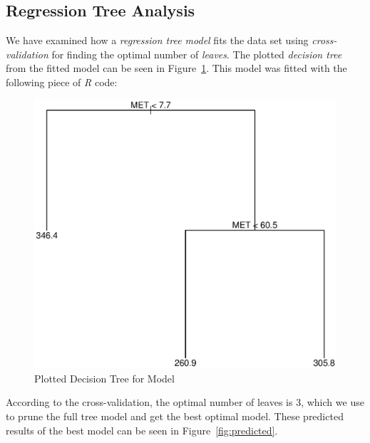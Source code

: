 \documentclass[a4paper,12pt]{article}
\begin{document}
    \subsection*{Regression Tree Analysis}

        We have examined how a \emph{regression tree model} fits the data set using \emph{cross-validation} for finding the optimal number of \emph{leaves}. The plotted \emph{decision tree} from the fitted model can be seen in Figure~\ref{fig:tree}. This model was fitted with the following piece of \emph{R} code:

        

        \begin{figure}[H]
            \centering
            \caption{Plotted Decision Tree for Model}
            \label{fig:tree}
            \includegraphics[width=\textwidth]{share/A1_tree.eps}
        \end{figure}

        According to the cross-validation, the optimal number of leaves is 3, which we use to prune the full tree model and get the best optimal model. These predicted results of the best model can be seen in Figure~\ref{fig:predicted}.
\end{document}
